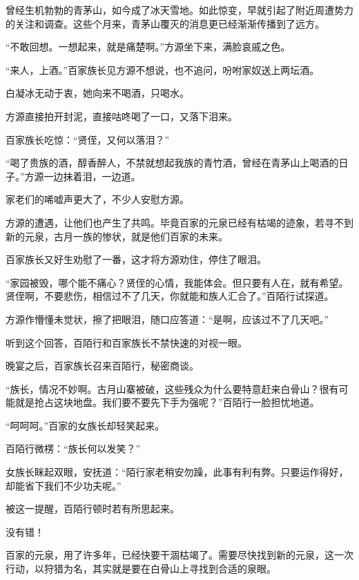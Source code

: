 
\begin{this_body}

曾经生机勃勃的青茅山，如今成了冰天雪地。如此惊变，早就引起了附近周遭势力的关注和调查。这些个月来，青茅山覆灭的消息更已经渐渐传播到了远方。

“不敢回想。一想起来，就是痛楚啊。”方源坐下来，满脸哀戚之色。

“来人，上酒。”百家族长见方源不想说，也不追问，吩咐家奴送上两坛酒。

白凝冰无动于衷，她向来不喝酒，只喝水。

方源直接拍开封泥，直接咕咚喝了一口，又落下泪来。

百家族长吃惊：“贤侄，又何以落泪？”

“喝了贵族的酒，醇香醉人，不禁就想起我族的青竹酒，曾经在青茅山上喝酒的日子。”方源一边抹着泪，一边道。

家老们的唏嘘声更大了，不少人安慰方源。

方源的遭遇，让他们也产生了共鸣。毕竟百家的元泉已经有枯竭的迹象，若寻不到新的元泉，古月一族的惨状，就是他们百家的未来。

百家族长又好生劝慰了一番，这才将方源劝住，停住了眼泪。

“家园被毁，哪个能不痛心？贤侄的心情，我能体会。但只要有人在，就有希望。贤侄啊，不要悲伤，相信过不了几天，你就能和族人汇合了。”百陌行试探道。

方源作懵懂未觉状，擦了把眼泪，随口应答道：“是啊，应该过不了几天吧。”

听到这个回答，百陌行和百家族长不禁快速的对视一眼。

晚宴之后，百家族长召来百陌行，秘密商谈。

“族长，情况不妙啊。古月山寨被破，这些残众为什么要特意赶来白骨山？很有可能就是抢占这块地盘。我们要不要先下手为强呢？”百陌行一脸担忧地道。

“呵呵呵。”百家的女族长却轻笑起来。

百陌行微楞：“族长何以发笑？”

女族长眯起双眼，安抚道：“陌行家老稍安勿躁，此事有利有弊。只要运作得好，却能省下我们不少功夫呢。”

被这一提醒，百陌行顿时若有所思起来。

没有错！

百家的元泉，用了许多年，已经快要干涸枯竭了。需要尽快找到新的元泉，这一次行动，以狩猎为名，其实就是要在白骨山上寻找到合适的泉眼。


\end{this_body}
